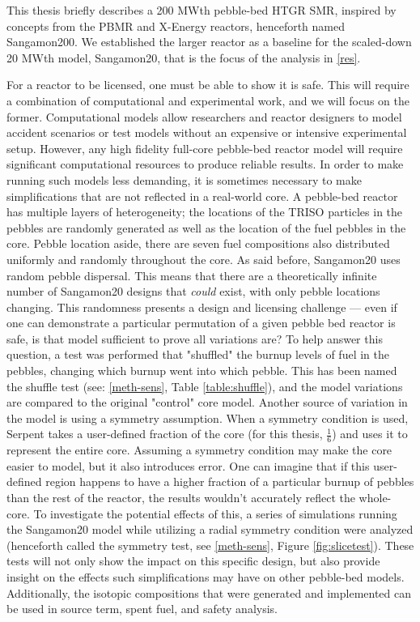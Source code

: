 This thesis briefly describes a 200 MWth pebble-bed HTGR SMR, inspired by concepts from the PBMR \cite{venter_pbmr_2005} and X-Energy \cite{harlan_x-energy_2018} reactors, henceforth named Sangamon200.  We established the larger reactor as a baseline for the scaled-down 20 MWth model, Sangamon20, that is the focus of the analysis in \autoref{res}.

For a reactor to be licensed, one must be able to show it is safe.  This will require a combination of computational and experimental work, and we will focus on the former.  Computational models allow researchers and reactor designers to model accident scenarios or test models without an expensive or intensive experimental setup. However, any high fidelity full-core pebble-bed reactor model will require significant computational resources to produce reliable results.  In order to make running such models less demanding, it is sometimes necessary to make simplifications that are not reflected in a real-world core.  A pebble-bed reactor has multiple layers of heterogeneity; the locations of the TRISO particles in the pebbles are randomly generated as well as the location of the fuel pebbles in the core.  Pebble location aside, there are seven fuel compositions also distributed uniformly and randomly throughout the core.  As said before, Sangamon20 uses random pebble dispersal.  This means that there are a theoretically infinite number of Sangamon20 designs that \emph{could} exist, with only pebble locations changing.  This randomness presents a design and licensing challenge --- even if one can demonstrate a particular permutation of a given pebble bed reactor is safe, is that model sufficient to prove all variations are?  To help answer this question, a test was performed that "shuffled" the burnup levels of fuel in the pebbles, changing which burnup went into which pebble.  This has been named the shuffle test (see: \autoref{meth-sens}, Table \ref{table:shuffle}), and the model variations are compared to the original "control" core model.  Another source of variation in the model is using a symmetry assumption.  When a symmetry condition is used, Serpent takes a user-defined fraction of the core (for this thesis, $\frac{1}{6}$) and uses it to represent the entire core.  Assuming a symmetry condition may make the core easier to model, but it also introduces error.  One can imagine that if this user-defined region happens to have a higher fraction of a particular burnup of pebbles than the rest of the reactor, the results wouldn't accurately reflect the whole-core.  To investigate the potential effects of this, a series of simulations running the Sangamon20 model while utilizing a radial symmetry condition were analyzed (henceforth called the symmetry test, see \autoref{meth-sens}, Figure \ref{fig:slicetest}).  These tests will not only show the impact on this specific design, but also provide insight on the effects such simplifications may have on other pebble-bed models.  Additionally, the isotopic compositions that were generated and implemented can be used in source term, spent fuel, and safety analysis.

